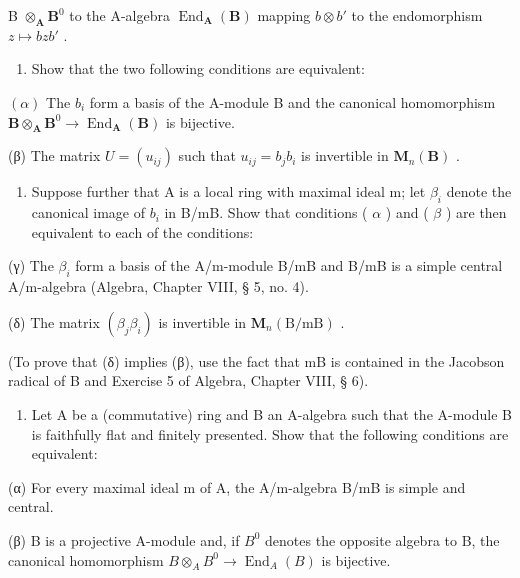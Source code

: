 B \(\otimes_{\mathbf{A}}\mathbf{B}^{0}\) to the A-algebra \(\operatorname{End}_{\mathbf{A}}(\mathbf{B})\) mapping \(b\otimes b'\) to the endomorphism \(z\mapsto bzb'\) .

\begin{enumerate}
\def\labelenumi{(\alph{enumi})}
\tightlist
\item
  Show that the two following conditions are equivalent:
\end{enumerate}

\((\alpha)\) The \(b_{i}\) form a basis of the A-module B and the canonical homomorphism \(\mathbf{B} \otimes_{\mathbf{A}} \mathbf{B}^{0} \to \operatorname{End}_{\mathbf{A}}(\mathbf{B})\) is bijective.

(β) The matrix \(U = (u_{ij})\) such that \(u_{ij} = b_j b_i\) is invertible in \(\mathbf{M}_n(\mathbf{B})\) .

\begin{enumerate}
\def\labelenumi{(\alph{enumi})}
\setcounter{enumi}{1}
\tightlist
\item
  Suppose further that A is a local ring with maximal ideal m; let \(\beta_{i}\) denote the canonical image of \(b_{i}\) in B/mB. Show that conditions ( \(\alpha\) ) and ( \(\beta\) ) are then equivalent to each of the conditions:
\end{enumerate}

(γ) The \(\beta_{i}\) form a basis of the A/m-module B/mB and B/mB is a simple central A/m-algebra (Algebra, Chapter VIII, § 5, no. 4).

(δ) The matrix \((\beta_{j}\beta_{i})\) is invertible in \(\mathbf{M}_{n}(\mathrm{B}/\mathrm{mB})\) .

(To prove that (δ) implies (β), use the fact that mB is contained in the Jacobson radical of B and Exercise 5 of Algebra, Chapter VIII, § 6).

\begin{enumerate}
\def\labelenumi{\arabic{enumi}.}
\setcounter{enumi}{13}
\tightlist
\item
  Let A be a (commutative) ring and B an A-algebra such that the A-module B is faithfully flat and finitely presented. Show that the following conditions are equivalent:
\end{enumerate}

(α) For every maximal ideal m of A, the A/m-algebra B/mB is simple and central.

(β) B is a projective A-module and, if \(B^{0}\) denotes the opposite algebra to B, the canonical homomorphism \(B \otimes_{A} B^{0} \to \operatorname{End}_{A}(B)\) is bijective.

